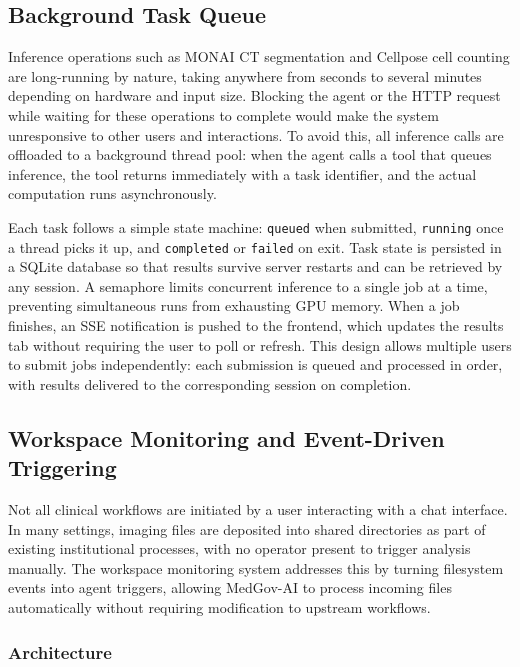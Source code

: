 \documentclass[conference]{IEEEtran}
\begin{document}
\subsection{Background Task Queue}

Inference operations such as MONAI CT segmentation and Cellpose cell counting are long-running by nature, taking anywhere from seconds to several minutes depending on hardware and input size. Blocking the agent or the HTTP request while waiting for these operations to complete would make the system unresponsive to other users and interactions. To avoid this, all inference calls are offloaded to a background thread pool: when the agent calls a tool that queues inference, the tool returns immediately with a task identifier, and the actual computation runs asynchronously.

Each task follows a simple state machine: \texttt{queued} when submitted, \texttt{running} once a thread picks it up, and \texttt{completed} or \texttt{failed} on exit. Task state is persisted in a SQLite database so that results survive server restarts and can be retrieved by any session. A semaphore limits concurrent inference to a single job at a time, preventing simultaneous runs from exhausting GPU memory.
When a job finishes, an SSE notification is pushed to the frontend, which updates the results tab without requiring the user to poll or refresh. This design allows multiple users to submit jobs independently: each submission is queued and processed in order, with results delivered to the corresponding session on completion.



\subsection{Workspace Monitoring and Event-Driven Triggering}

Not all clinical workflows are initiated by a user interacting with a chat interface. In many settings, imaging files are deposited into shared directories as part of existing institutional processes, with no operator present to trigger analysis manually. The workspace monitoring system addresses this by turning filesystem events into agent triggers, allowing MedGov-AI to process incoming files automatically without requiring modification to upstream workflows.

\subsubsection{Architecture}
\end{document}
